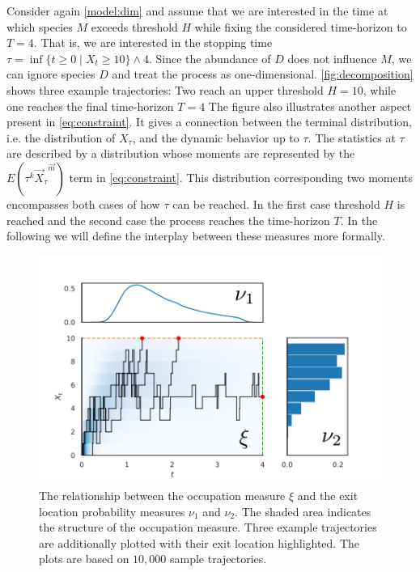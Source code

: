 Consider again \autoref{model:dim} and assume that we are interested in the
time at which species $M$ exceeds  threshold $H$ while fixing the considered time-horizon to
$T=4$. That is, we are interested in the stopping time $\tau=\inf\{t\geq 0\mid X_t\geq 10\}\land 4$.
Since the abundance of $D$ does not influence $M$, we can ignore
species $D$ and treat the process as one-dimensional.
\autoref{fig:decomposition} shows three example trajectories:
Two reach an upper threshold $H=10$, while one reaches the final time-horizon $T=4$
The figure also illustrates another aspect present in \eqref{eq:constraint}.
It gives a connection between the terminal distribution, i.e. the distribution of $X_{\tau}$,
and the dynamic behavior up to $\tau$.
The statistics at $\tau$ are described by a distribution whose %
moments are represented by the $E(\tau^k{\vec{X}_{\tau}}^{\vec{m}})$ term in \eqref{eq:constraint}.
This distribution corresponding two moments encompasses both cases of how
$\tau$ can be reached. In the first case threshold $H$ is reached and the second case the process reaches the time-horizon $T$.
In the following we will define the interplay between these measures more formally.
\begin{figure}[t]
    \centering
    \includegraphics[scale=.8]{gfx/decomp1.pdf}
    \caption{The relationship between the occupation measure $\xi$ and the
    exit location probability measures $\nu_1$ and $\nu_2$. The shaded area indicates
    the structure of the occupation measure. Three example trajectories are
    additionally plotted with
    their exit location highlighted. The plots are based on $10,\!000$ sample trajectories.}
    \label{fig:decomposition}
\end{figure}


